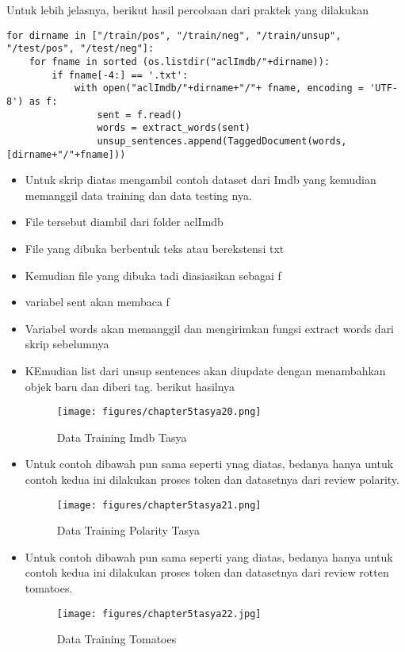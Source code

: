 Untuk lebih jelasnya, berikut hasil percobaan dari praktek yang dilakukan
\begin{verbatim}
for dirname in ["/train/pos", "/train/neg", "/train/unsup", "/test/pos", "/test/neg"]:
    for fname in sorted (os.listdir("aclImdb/"+dirname)):
        if fname[-4:] == '.txt':
            with open("aclImdb/"+dirname+"/"+ fname, encoding = 'UTF-8') as f:
                sent = f.read()
                words = extract_words(sent)
                unsup_sentences.append(TaggedDocument(words,[dirname+"/"+fname]))
\end{verbatim}
\begin{itemize}
\item Untuk skrip diatas mengambil contoh dataset dari Imdb yang kemudian memanggil data training dan data testing nya.
\item File tersebut diambil dari folder aclImdb
\item File yang dibuka berbentuk teks atau berekstensi txt
\item Kemudian file yang dibuka tadi diasiasikan sebagai f
\item variabel sent akan membaca f
\item Variabel words akan memanggil dan mengirimkan fungsi extract words dari skrip sebelumnya
\item KEmudian list dari unsup sentences akan diupdate dengan menambahkan objek baru dan diberi tag. berikut hasilnya
\begin{figure}[ht]
\centering
\texttt{[image: figures/chapter5tasya20.png]}
\caption{Data Training Imdb Tasya}
\label{Praktek}
\end{figure}
\end{itemize}
\begin{itemize}
\item Untuk contoh dibawah pun sama seperti ynag diatas, bedanya hanya untuk contoh kedua ini dilakukan proses token dan datasetnya dari review polarity.
\begin{figure}[ht]
\centering
\texttt{[image: figures/chapter5tasya21.png]}
\caption{Data Training Polarity Tasya}
\label{Praktek}
\end{figure}

\item Untuk contoh dibawah pun sama seperti yang diatas, bedanya hanya untuk contoh kedua ini dilakukan proses token dan datasetnya dari review rotten tomatoes.
\begin{figure}[ht]
\centering
\texttt{[image: figures/chapter5tasya22.jpg]}
\caption{Data Training Tomatoes}
\label{Praktek}
\end{figure}
\end{itemize}

